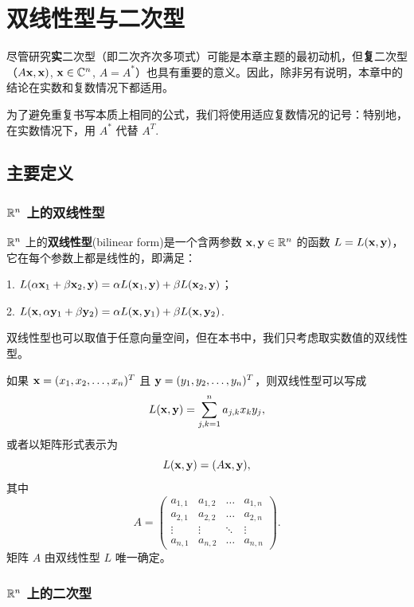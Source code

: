 

\chapter{双线性型与二次型}\label{chap:07}


尽管研究\textbf{实}二次型（即二次齐次多项式）可能是本章主题的最初动机，但\textbf{复}二次型（$A \mathbf{x}, \mathbf{x})$, $\mathbf{x} \in \mathbb{C}^n$, $A = A^*$）也具有重要的意义。因此，除非另有说明，本章中的结论在实数和复数情况下都适用。

为了避免重复书写本质上相同的公式，我们将使用适应复数情况的记号：特别地，在实数情况下，用 $A^*$ 代替 $A^T$.~

\section{主要定义}\label{sec:07-01}

\subsection{\texorpdfstring{$\mathbb{R}^n$ 上的双线性型}{R^n 上的双线性型}}\label{sec:07-01-01}

$\mathbb{R}^n$ 上的\textbf{双线性型}(bilinear form)是一个含两参数 $\mathbf{x}, \mathbf{y} \in \mathbb{R}^n$ 的函数 $L = L(\mathbf{x}, \mathbf{y})$，它在每个参数上都是线性的，即满足：

1. $L(\alpha \mathbf{x}_1 + \beta \mathbf{x}_2, \mathbf{y}) = \alpha L(\mathbf{x}_1, \mathbf{y}) + \beta L(\mathbf{x}_2, \mathbf{y})$；

2. $L(\mathbf{x}, \alpha \mathbf{y}_1 + \beta \mathbf{y}_2) = \alpha L(\mathbf{x}, \mathbf{y}_1) + \beta L(\mathbf{x}, \mathbf{y}_2)$.~

双线性型也可以取值于任意向量空间，但在本书中，我们只考虑取实数值的双线性型。

如果 $\mathbf{x} = (x_1, x_2, \dots, x_n)^T$ 且 $\mathbf{y} = (y_1, y_2, \dots, y_n)^T$，则双线性型可以写成
$$L(\mathbf{x}, \mathbf{y}) = \sum_{j,k=1}^n a_{j,k} x_k y_j,$$
或者以矩阵形式表示为
$$L(\mathbf{x}, \mathbf{y}) = (A \mathbf{x}, \mathbf{y}),$$
其中
$$A = \begin{pmatrix} a_{1,1} & a_{1,2} & \dots & a_{1,n} \\ a_{2,1} & a_{2,2} & \dots & a_{2,n} \\ \vdots & \vdots & \ddots & \vdots \\ a_{n,1} & a_{n,2} & \dots & a_{n,n} \end{pmatrix}.$$
矩阵 $A$ 由双线性型 $L$ 唯一确定。

\subsection{\texorpdfstring{$\mathbb{R}^n$ 上的二次型}{R^n 上的二次型}}\label{sec:07-01-02}

